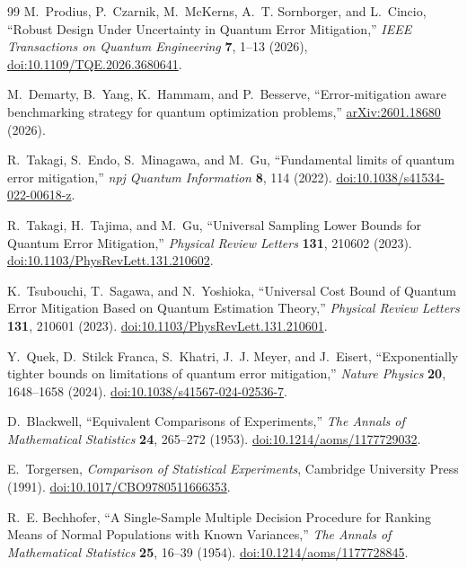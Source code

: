 \documentclass[a4paper,onecolumn,unpublished,nopdfoutputerror]{quantumarticle}
\theoremstyle{plain}
\theoremstyle{definition}
\newcommand{\1}{\mathbf{1}}
\begin{document}
\begin{thebibliography}{99}
M.~Prodius, P.~Czarnik, M.~McKerns, A.~T. Sornborger, and L.~Cincio,
``Robust Design Under Uncertainty in Quantum Error Mitigation,''
\emph{IEEE Transactions on Quantum Engineering} \textbf{7}, 1--13 (2026),
\href{https://doi.org/10.1109/TQE.2026.3680641}{doi:10.1109/TQE.2026.3680641}.

M.~Demarty, B.~Yang, K.~Hammam, and P.~Besserve,
``Error-mitigation aware benchmarking strategy for quantum optimization problems,''
\href{https://arxiv.org/abs/2601.18680}{arXiv:2601.18680} (2026).

R.~Takagi, S.~Endo, S.~Minagawa, and M.~Gu,
``Fundamental limits of quantum error mitigation,''
\emph{npj Quantum Information} \textbf{8}, 114 (2022). \href{https://doi.org/10.1038/s41534-022-00618-z}{doi:10.1038/s41534-022-00618-z}.

R.~Takagi, H.~Tajima, and M.~Gu,
``Universal Sampling Lower Bounds for Quantum Error Mitigation,''
\emph{Physical Review Letters} \textbf{131}, 210602 (2023). \href{https://doi.org/10.1103/PhysRevLett.131.210602}{doi:10.1103/PhysRevLett.131.210602}.

K.~Tsubouchi, T.~Sagawa, and N.~Yoshioka,
``Universal Cost Bound of Quantum Error Mitigation Based on Quantum Estimation Theory,''
\emph{Physical Review Letters} \textbf{131}, 210601 (2023). \href{https://doi.org/10.1103/PhysRevLett.131.210601}{doi:10.1103/PhysRevLett.131.210601}.

Y.~Quek, D.~Stilck Franca, S.~Khatri, J.~J. Meyer, and J.~Eisert,
``Exponentially tighter bounds on limitations of quantum error mitigation,''
\emph{Nature Physics} \textbf{20}, 1648--1658 (2024). \href{https://doi.org/10.1038/s41567-024-02536-7}{doi:10.1038/s41567-024-02536-7}.

D.~Blackwell,
``Equivalent Comparisons of Experiments,''
\emph{The Annals of Mathematical Statistics} \textbf{24}, 265--272 (1953). \href{https://doi.org/10.1214/aoms/1177729032}{doi:10.1214/aoms/1177729032}.

E.~Torgersen,
\emph{Comparison of Statistical Experiments},
Cambridge University Press (1991). \href{https://doi.org/10.1017/CBO9780511666353}{doi:10.1017/CBO9780511666353}.

R.~E. Bechhofer,
``A Single-Sample Multiple Decision Procedure for Ranking Means of Normal Populations with Known Variances,''
\emph{The Annals of Mathematical Statistics} \textbf{25}, 16--39 (1954). \href{https://doi.org/10.1214/aoms/1177728845}{doi:10.1214/aoms/1177728845}.


\end{thebibliography}
\end{document}
